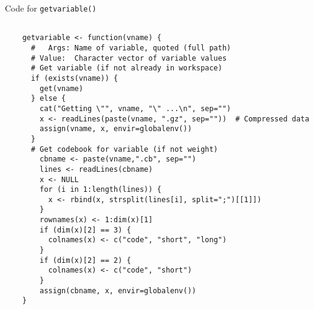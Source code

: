 \begin{table}
\caption{Code for {\tt getvariable()}}
\begin{verbatim}

    getvariable <- function(vname) {
      #   Args: Name of variable, quoted (full path)
      # Value:  Character vector of variable values
      # Get variable (if not already in workspace)
      if (exists(vname)) {
        get(vname)
      } else {
        cat("Getting \"", vname, "\" ...\n", sep="")
        x <- readLines(paste(vname, ".gz", sep=""))  # Compressed data
        assign(vname, x, envir=globalenv())
      }
      # Get codebook for variable (if not weight)
        cbname <- paste(vname,".cb", sep="")
        lines <- readLines(cbname)
        x <- NULL
        for (i in 1:length(lines)) {
          x <- rbind(x, strsplit(lines[i], split=";")[[1]])
        }
        rownames(x) <- 1:dim(x)[1]
        if (dim(x)[2] == 3) {
          colnames(x) <- c("code", "short", "long")
        }
        if (dim(x)[2] == 2) {
          colnames(x) <- c("code", "short")
        } 
        assign(cbname, x, envir=globalenv())
    }
	
\end{verbatim}
\end{table}



